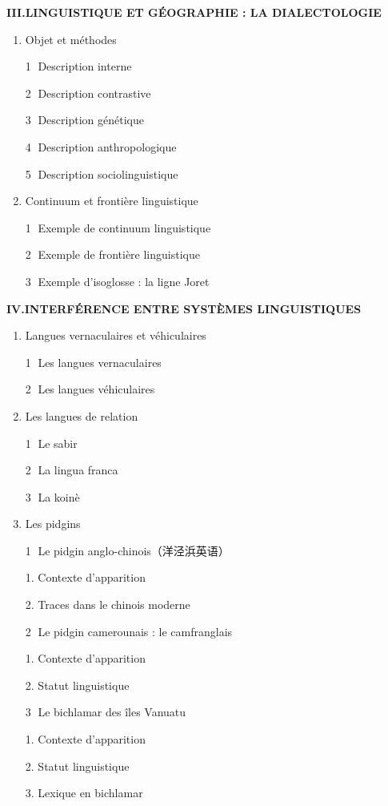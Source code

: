 \begin{keybox}
\begin{enumerate}[label=\arabic*.]
\end{enumerate}
\textbf{III.\quad LINGUISTIQUE ET GÉOGRAPHIE : LA DIALECTOLOGIE}
\begin{enumerate}[label=\arabic*.]
\item Objet et méthodes\par \textcircled{\scriptsize 1} Description interne\par \textcircled{\scriptsize 2} Description contrastive\par \textcircled{\scriptsize 3} Description génétique\par \textcircled{\scriptsize 4} Description anthropologique\par \textcircled{\scriptsize 5} Description sociolinguistique
\item Continuum et frontière linguistique\par \textcircled{\scriptsize 1} Exemple de continuum linguistique\par \textcircled{\scriptsize 2} Exemple de frontière linguistique\par \textcircled{\scriptsize 3} Exemple d’isoglosse : la ligne Joret
\end{enumerate}
\textbf{IV.\quad INTERFÉRENCE ENTRE SYSTÈMES LINGUISTIQUES}
\begin{enumerate}[label=\arabic*.]
\item Langues vernaculaires et véhiculaires\par \textcircled{\scriptsize 1} Les langues vernaculaires\par \textcircled{\scriptsize 2} Les langues véhiculaires
\tcbbreak{}
\item Les langues de relation\par \textcircled{\scriptsize 1} Le sabir\par \textcircled{\scriptsize 2} La lingua franca\par \textcircled{\scriptsize 3} La koinè
\item Les pidgins\par \textcircled{\scriptsize 1} Le pidgin anglo-chinois（洋泾浜英语）\par\hspace*{1em}1. Contexte d’apparition\par\hspace*{1em}2. Traces dans le chinois moderne\par \textcircled{\scriptsize 2} Le pidgin camerounais : le camfranglais\par\hspace*{1em}1. Contexte d’apparition\par\hspace*{1em}2. Statut linguistique\par \textcircled{\scriptsize 3} Le bichlamar des îles Vanuatu\par\hspace*{1em}1. Contexte d’apparition\par\hspace*{1em}2. Statut linguistique\par\hspace*{1em}3. Lexique en bichlamar

\end{enumerate}
\end{keybox}
